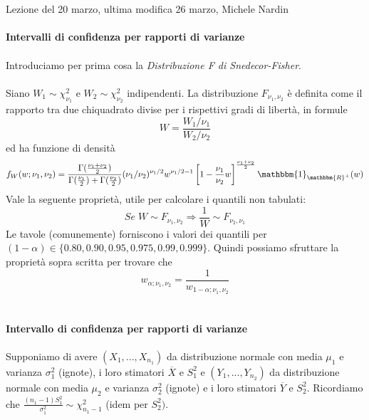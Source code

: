 \\ \\
Lezione del 20 marzo, ultima modifica 26 marzo, Michele Nardin
\\ \\
\noindent\textbf{Intervalli di confidenza per rapporti di varianze}\\ \\

Introduciamo per prima cosa la \textit{Distribuzione F di Snedecor-Fisher}.
\\ \\
Siano $W_1 \sim \chi^2_{\nu_1}$ e $W_2 \sim \chi^2_{\nu_2}$ indipendenti.
La distribuzione $F_{\nu_1,\nu_2}$ è definita come il rapporto tra due chiquadrato divise per i
rispettivi gradi di libertà, in formule $$W=\frac{W_1/\nu_{1}}{W_2/\nu_{2}}$$ ed ha funzione di densità $$f_W(w;\nu_1,\nu_2)=\frac{\Gamma(\frac{\nu_1 + \nu_2}{2})}{\Gamma(\frac{\nu_1}{2})+\Gamma(\frac{\nu_2}{2})} (\nu_1 / \nu_2)^{\nu_1 / 2} w^{\nu_1 / 2 - 1} \left[ 1 - \frac{\nu_1}{\nu_2} w  \right]^{\frac{\nu_1 + \nu_2}{2}} \mathbbm{1}_{\mathbbm{R}^+} (w)$$
Vale la seguente proprietà, utile per calcolare i quantili non tabulati:
$$Se \; W \sim F_{\nu_1,\nu_2} \Rightarrow \frac{1}{W} \sim F_{\nu_2,\nu_1}$$
Le tavole (comunemente) forniscono i valori dei quantili per $(1-\alpha) \in \{0.80, 0.90, 0.95, 0.975, 0.99, 0.999\}$. Quindi possiamo sfruttare la proprietà sopra scritta per trovare che $$w_{\alpha;\nu_1,\nu_2}=\frac{1}{w_{1-\alpha;\nu_1,\nu_2}}$$
\\ \\
\textbf{Intervallo di confidenza per rapporti di varianze}
\\ \\
 Supponiamo di avere $(X_1,...,X_{n_1})$ da distribuzione normale con media $\mu_1$ e varianza $\sigma_1^2$ (ignote), i loro stimatori $\overline{X}$ e $S^2_1$ e
 $(Y_1,...,Y_{n_2})$ da distribuzione normale con media $\mu_2$ e varianza $\sigma_2^2$ (ignote) e i loro stimatori $\overline{Y}$ e $S^2_2$.
 Ricordiamo che $\frac{(n_1-1)S^2_1}{\sigma^2_1} \sim \chi^2_{n_1 - 1}$ (idem per $S^2_2)$.
 

